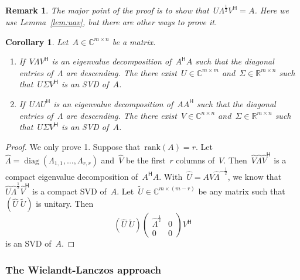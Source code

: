 \documentclass[11pt,a4paper]{article}  %
\numberwithin{equation}{section}
\newtheorem{corollary}{Corollary}%
\newtheorem{remark}{Remark}%
\theoremstyle{definition}
\def\RR{\mathbb{R}}
\def\CC{\mathbb{C}}
\newcommand{\hmt}{{\scriptscriptstyle{{\mathsf{H}}}}}
\newcommand{\rank}{\mathrm{rank}}
\newcommand{\diag}{\operatorname*{diag}}
\begin{document}
\begin{remark}
The major point of the proof is to show that~$U\Lambda^{\frac{1}{2}}V^\hmt =A$. Here we use
Lemma~\ref{lem:uav}, but there are other ways to prove it.
\end{remark}

\begin{corollary}
  \label{coro:eyfull}
  Let~$A \in \CC^{m\times n}$ be a matrix.
  \begin{enumerate}[leftmargin=1.5em]
    \item If~$V\Lambda V^\hmt$ is an eigenvalue decomposition of~$A^\hmt A$ such
      that the diagonal entries of~$\Lambda$ are descending. The there exist~$U\in \CC^{m\times m}$
      and~$\Sigma \in \RR^{m\times n}$ such that~$U\Sigma V^\hmt$ is an SVD of~$A$.
    \item If~$U\Lambda U^\hmt$ is an eigenvalue decomposition of~$AA^\hmt$ such
      that the diagonal entries of~$\Lambda$ are descending. The there exist~$V\in \CC^{n\times n}$
      and~$\Sigma \in \RR^{m\times n}$ such that~$U\Sigma V^\hmt$ is an SVD of~$A$.
  \end{enumerate}
\end{corollary}

\begin{proof}
  We only prove 1. Suppose that~$\rank(A) = r$. Let~$\hat{\Lambda} = \diag(\Lambda_{1,1}, \dots,
  \Lambda_{r,r})$ and~$\hat{V}$ be the first~$r$ columns of~$V$. Then~$\hat{V} \hat{\Lambda}
  \hat{V}^\hmt$ is a compact eigenvalue decomposition of~$A^\hmt A$. With~$\hat{U}
  = A\hat{V}\hat{\Lambda}^{-\frac{1}{2}}$, we know that~$\hat{U}\hat{\Lambda}^{\frac{1}{2}}\hat{V}^\hmt$ is
  a compact SVD of~$A$.
  Let~$\tilde{U}\in \CC^{m\times(m-r)}$ be any matrix such that~$(\hat{U}\; \tilde{U})$ is
  unitary. Then
  \begin{equation*}
    (\hat{U}\; \tilde{U})
    \begin{pmatrix}
      \hat{\Lambda}^{\frac{1}{2}} & 0\\
      0 & 0
    \end{pmatrix}
    V^\hmt
  \end{equation*}
  is an SVD of~$A$.
\end{proof}

\subsubsection{The Wielandt-Lanczos approach~\cite{Lanczos_1958}}
\end{document}
